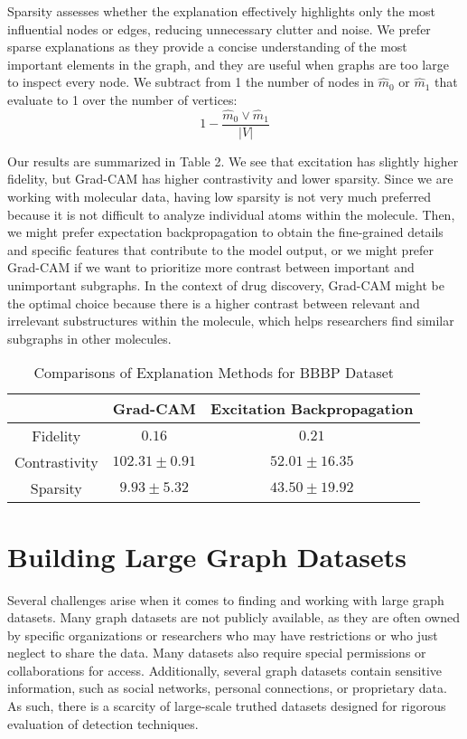 \documentclass[final]{article}
\begin{document}
Sparsity assesses whether the explanation effectively highlights only the most influential nodes or edges, reducing unnecessary clutter and noise. We prefer sparse explanations as they provide a concise understanding of the most important elements in the graph, and they are useful when graphs are too large to inspect every node. We subtract from 1 the number of nodes in $\hat{m}_0$ or $\hat{m}_1$ that evaluate to 1 over the number of vertices: 
$$1 - \frac{\hat{m}_0 \lor \hat{m}_1}{|V|}$$

Our results are summarized in Table 2. We see that excitation has slightly higher fidelity, but Grad-CAM has higher contrastivity and lower sparsity. Since we are working with molecular data, having low sparsity is not very much preferred because it is not difficult to analyze individual atoms within the molecule. Then, we might prefer expectation backpropagation to obtain the fine-grained details and specific features that contribute to the model output, or we might prefer Grad-CAM if we want to prioritize more contrast between important and unimportant subgraphs. In the context of drug discovery, Grad-CAM might be the optimal choice because there is a higher contrast between relevant and irrelevant substructures within the molecule, which helps researchers find similar subgraphs in other molecules. 

\begin{table}[]
    \centering
    \begin{tabular}{|c|c|c|}
    \hline 
        & \textbf{Grad-CAM} & \textbf{Excitation Backpropagation}\\
        \hline 
        \hline 
         Fidelity & $0.16$ & $0.21$ \\
         \hline
         Contrastivity & $102.31 \pm 0.91$ & $52.01\pm 16.35$\\
         \hline 
         Sparsity & $9.93 \pm 5.32$ & $43.50 \pm 19.92$ \\
         \hline
    \end{tabular}
    \caption{Comparisons of Explanation Methods for BBBP Dataset}
    \label{tab:my_label}
\end{table}

\newpage

\section{Building Large Graph Datasets}
Several challenges arise when it comes to finding and working with large graph datasets. Many graph datasets are not publicly available, as they are often owned by specific organizations or researchers who may have restrictions or who just neglect to share the data. Many datasets also require special permissions or collaborations for access. Additionally, several graph datasets contain sensitive information, such as social networks, personal connections, or proprietary data. As such, there is a scarcity of large-scale truthed datasets designed for rigorous evaluation of detection techniques. \cite{Bliss2018} 
\end{document}
